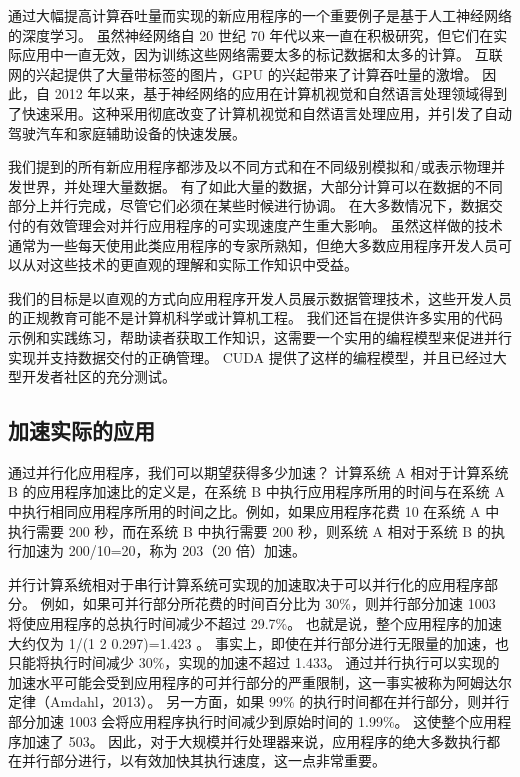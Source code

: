 通过大幅提高计算吞吐量而实现的新应用程序的一个重要例子是基于人工神经网络的深度学习。 虽然神经网络自 20 世纪 70 年代以来一直在积极研究，但它们在实际应用中一直无效，因为训练这些网络需要太多的标记数据和太多的计算。 互联网的兴起提供了大量带标签的图片，GPU 的兴起带来了计算吞吐量的激增。 因此，自 2012 年以来，基于神经网络的应用在计算机视觉和自然语言处理领域得到了快速采用。这种采用彻底改变了计算机视觉和自然语言处理应用，并引发了自动驾驶汽车和家庭辅助设备的快速发展。

我们提到的所有新应用程序都涉及以不同方式和在不同级别模拟和/或表示物理并发世界，并处理大量数据。 有了如此大量的数据，大部分计算可以在数据的不同部分上并行完成，尽管它们必须在某些时候进行协调。 在大多数情况下，数据交付的有效管理会对并行应用程序的可实现速度产生重大影响。 虽然这样做的技术通常为一些每天使用此类应用程序的专家所熟知，但绝大多数应用程序开发人员可以从对这些技术的更直观的理解和实际工作知识中受益。

我们的目标是以直观的方式向应用程序开发人员展示数据管理技术，这些开发人员的正规教育可能不是计算机科学或计算机工程。 我们还旨在提供许多实用的代码示例和实践练习，帮助读者获取工作知识，这需要一个实用的编程模型来促进并行实现并支持数据交付的正确管理。 CUDA 提供了这样的编程模型，并且已经过大型开发者社区的充分测试。

\subsection{加速实际的应用}
通过并行化应用程序，我们可以期望获得多少加速？ 计算系统 A 相对于计算系统 B 的应用程序加速比的定义是，在系统 B 中执行应用程序所用的时间与在系统 A 中执行相同应用程序所用的时间之比。例如，如果应用程序花费 10 在系统 A 中执行需要 200 秒，而在系统 B 中执行需要 200 秒，则系统 A 相对于系统 B 的执行加速为 200/10=20，称为 203（20 倍）加速。

并行计算系统相对于串行计算系统可实现的加速取决于可以并行化的应用程序部分。 例如，如果可并行部分所花费的时间百分比为 30\%，则并行部分加速 1003 将使应用程序的总执行时间减少不超过 29.7\%。 也就是说，整个应用程序的加速大约仅为 1/(1 2 0.297)=1.423 。 事实上，即使在并行部分进行无限量的加速，也只能将执行时间减少 30\%，实现的加速不超过 1.433。 通过并行执行可以实现的加速水平可能会受到应用程序的可并行部分的严重限制，这一事实被称为阿姆达尔定律（Amdahl，2013）。 另一方面，如果 99\% 的执行时间都在并行部分，则并行部分加速 1003 会将应用程序执行时间减少到原始时间的 1.99\%。 这使整个应用程序加速了 503。 因此，对于大规模并行处理器来说，应用程序的绝大多数执行都在并行部分进行，以有效加快其执行速度，这一点非常重要。

